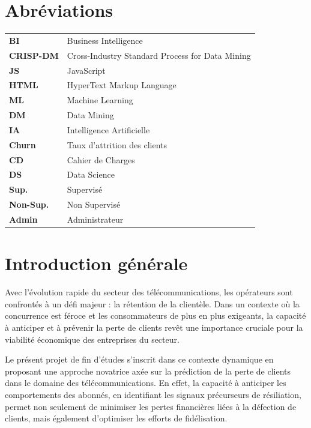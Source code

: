 \documentclass[a4paper,12pt]{report}
\begin{document}
\newpage

\tableofcontents
\listoffigures
\listoftables

\newpage

\chapter*{Abréviations}
\begin{tabular}{ll}
    \textbf{BI} & Business Intelligence \\
    \textbf{CRISP-DM} & Cross-Industry Standard Process for Data Mining \\
    \textbf{JS} & JavaScript \\
    \textbf{HTML} & HyperText Markup Language \\
    \textbf{ML} & Machine Learning \\
    \textbf{DM} & Data Mining \\
    \textbf{IA} & Intelligence Artificielle \\
    \textbf{Churn} & Taux d'attrition des clients \\
    \textbf{CD} & Cahier de Charges \\
    \textbf{DS} & Data Science \\
    \textbf{Sup.} & Supervisé \\
    \textbf{Non-Sup.} & Non Supervisé \\
    \textbf{Admin} & Administrateur \\
\end{tabular}

\newpage


\chapter*{Introduction générale}
Avec l'évolution rapide du secteur des télécommunications, les opérateurs sont confrontés à un défi majeur : la rétention de la clientèle. Dans un contexte où la concurrence est féroce et les consommateurs de plus en plus exigeants, la capacité à anticiper et à prévenir la perte de clients revêt une importance cruciale pour la viabilité économique des entreprises du secteur.

Le présent projet de fin d'études s'inscrit dans ce contexte dynamique en proposant une approche novatrice axée sur la prédiction de la perte de clients dans le domaine des télécommunications. En effet, la capacité à anticiper les comportements des abonnés, en identifiant les signaux précurseurs de résiliation, permet non seulement de minimiser les pertes financières liées à la défection de clients, mais également d'optimiser les efforts de fidélisation.
\end{document}
